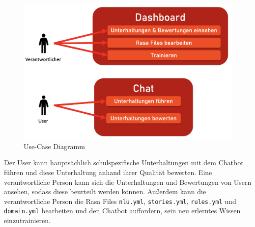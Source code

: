 \begin{figure}[hbt!]
    \centering
    \includegraphics[scale=0.5]{pics/usecase}
    \caption{Use-Case Diagramm}
    \label{fig:impl:usecase}
\end{figure}

Der User kann hauptsächlich schulspezifische Unterhaltungen mit dem Chatbot führen und diese Unterhaltung anhand ihrer Qualität bewerten.
Eine verantwortliche Person kann sich die Unterhaltungen und Bewertungen von Usern ansehen, sodass diese beurteilt werden können.
Außerdem kann die verantwortliche Person die Rasa Files \texttt{nlu.yml}, \texttt{stories.yml}, \texttt{rules.yml} und \texttt{domain.yml} bearbeiten und den Chatbot auffordern, sein neu erlerntes Wissen einzutrainieren.
